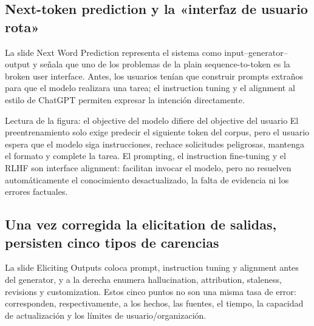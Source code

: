 
\subsection{Next-token prediction y la «interfaz de usuario rota»}

La slide Next Word Prediction representa el sistema como input--generator--output y señala que uno de los problemas de la plain sequence-to-token es la broken user interface. Antes, los usuarios tenían que construir prompts extraños para que el modelo realizara una tarea; el instruction tuning y el alignment al estilo de ChatGPT permiten expresar la intención directamente.


\begin{knowledgebox}{Lectura de la figura: el objective del modelo difiere del objective del usuario}
El preentrenamiento solo exige predecir el siguiente token del corpus, pero el usuario espera que el modelo siga instrucciones, rechace solicitudes peligrosas, mantenga el formato y complete la tarea. El prompting, el instruction fine-tuning y el RLHF son interface alignment: facilitan invocar el modelo, pero no resuelven automáticamente el conocimiento desactualizado, la falta de evidencia ni los errores factuales.
\end{knowledgebox}


\subsection{Una vez corregida la elicitation de salidas, persisten cinco tipos de carencias}

La slide Eliciting Outputs coloca prompt, instruction tuning y alignment antes del generator, y a la derecha enumera hallucination, attribution, staleness, revisions y customization. Estos cinco puntos no son una misma tasa de error: corresponden, respectivamente, a los hechos, las fuentes, el tiempo, la capacidad de actualización y los límites de usuario/organización.

